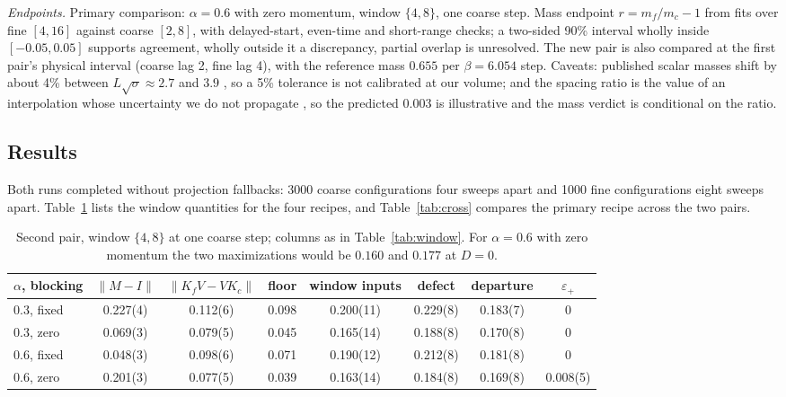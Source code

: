 \documentclass[11pt]{article}
\newcommand{\eps}{\varepsilon}
\begin{document}
\emph{Endpoints.} Primary comparison: $\alpha=0.6$ with zero momentum, window $\{4,8\}$, one coarse step.
Mass endpoint $r=m_f/m_c-1$ from fits over fine $[4,16]$ against coarse $[2,8]$, with delayed-start, even-time
and short-range checks; a two-sided 90\% interval wholly inside $[-0.05,0.05]$ supports agreement, wholly
outside it a discrepancy, partial overlap is unresolved. The new pair is also compared at the first pair's
physical interval (coarse lag 2, fine lag 4), with the reference mass $0.655$ per $\beta=6.054$ step.
Caveats: published scalar masses shift by about 4\% between $L\sqrt\sigma\approx2.7$ and $3.9$
\cite{AthenodorouTeper2020}, so a 5\% tolerance is not calibrated at our volume; and the spacing ratio
is the value of an interpolation whose uncertainty we do not propagate \cite{NeccoSommer2002}, so the
predicted $0.003$ is illustrative and the mass verdict is conditional on the ratio.

\subsection{Results}

Both runs completed without projection fallbacks: 3000 coarse configurations four sweeps apart and 1000
fine configurations eight sweeps apart. Table~\ref{tab:pair2} lists the window quantities for the four
recipes, and Table~\ref{tab:cross} compares the primary recipe across the two pairs.

\begin{table}[t]
\centering
\small\setlength{\tabcolsep}{4.5pt}
\begin{tabular}{@{}lccccccc@{}}
\toprule
$\alpha$, blocking & $\|M-I\|$ & $\|K_fV-VK_c\|$ & floor & window inputs & defect & departure & $\eps_+$ \\
\midrule
0.3, fixed & 0.227(4) & 0.112(6) & 0.098 & 0.200(11) & 0.229(8) & 0.183(7) & 0 \\
0.3, zero & 0.069(3) & 0.079(5) & 0.045 & 0.165(14) & 0.188(8) & 0.170(8) & 0 \\
0.6, fixed & 0.048(3) & 0.098(6) & 0.071 & 0.190(12) & 0.212(8) & 0.181(8) & 0 \\
0.6, zero & 0.201(3) & 0.077(5) & 0.039 & 0.163(14) & 0.184(8) & 0.169(8) & 0.008(5) \\
\bottomrule
\end{tabular}
\caption{Second pair, window $\{4,8\}$ at one coarse step; columns as in Table~\ref{tab:window}. For
$\alpha=0.6$ with zero momentum the two maximizations would be $0.160$ and $0.177$ at $D=0$.}
\label{tab:pair2}
\end{table}
\end{document}

